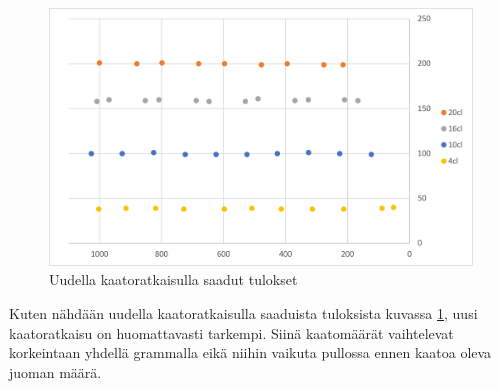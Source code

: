 \begin{figure}[h]
\begin{center}
\includegraphics[scale=0.25]{img/kaadot_uusi.pdf}
\end{center}
\caption{Uudella kaatoratkaisulla saadut tulokset}
\label{fig:kaadot_uusi}
\end{figure}

Kuten nähdään uudella kaatoratkaisulla saaduista tuloksista kuvassa \ref{fig:kaadot_uusi}, uusi kaatoratkaisu on huomattavasti tarkempi. Siinä kaatomäärät vaihtelevat korkeintaan yhdellä grammalla eikä niihin vaikuta pullossa ennen kaatoa oleva juoman määrä.
